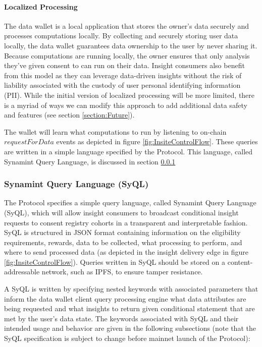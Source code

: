 \paragraph{Localized Processing} %

The data wallet is a local application that stores the owner's data securely and processes computations locally. By collecting and 
securely storing user data locally, the data wallet guarantees data ownership to the user by never sharing it. Because computations 
are running locally, the owner ensures that only analysis they've given consent to can run on their data. Insight consumers also benefit 
from this model as they can leverage data-driven insights without the risk of liability associated with the custody of user personal identifying information (PII). While the initial version of localized processing will be more limited, there is a myriad of ways we can modify this 
approach to add additional data safety and features (see section \ref{section:Future}). 

The wallet will learn what computations to run by listening to on-chain $requestForData$ events as depicted in figure \ref{fig:InsiteControlFlow}. These queries are written in a simple language specified by the Protocol. This language, called Synamint Query Language, is discussed in section \ref{section:SyQL}

\subsubsection{Synamint Query Language (SyQL)} %
\label{section:SyQL}

The Protocol specifies a simple query language, called Synamint Query Language (SyQL), which will allow insight consumers to broadcast conditional insight requests to consent registry cohorts in a transparent and interpretable fashion. 
SyQL is structured in JSON format containing information on the eligibility requirements, rewards, data to be collected, what processing 
to perform, and where to send processed data (as depicted in the insight delivery edge in figure \ref{fig:InsiteControlFlow}). Queries written in SyQL should be stored on a content-addressable network, such as IPFS, to ensure tamper resistance. 

A SyQL is written by specifying nested keywords with associated parameters that inform the data wallet client query processing engine what data attributes are being requested and what insights to return given conditional statement that are met by the user's data state. The keywords associated with SyQL and their intended usage and behavior are given in the following subsections (note that the SyQL specification is subject to change before mainnet launch of the Protocol): 

